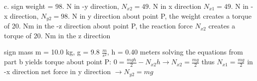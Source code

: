 c. sign weight = 98. N in -y direction, $N_{x2} = 49.$ N in x direction\newline
$N_{x1} = 49.$ N in -x direction, $N_{y2} = 98.$ N in y direction\newline
about point P, the weight creates a torque of 20. Nm in the -z direction\newline
about point P, the reaction force $N_{x2}$ creates a torque of 20. Nm in the z direction\newline

sign mass m = 10.0 kg, g = 9.8 $\frac{m}{s^{2}}$, h = 0.40 meters\newline
solving the equations from part b yields\newline
torque about point P: $0 = \frac{mgh}{2} - N_{x2}h \rightarrow N_{x2} = \frac{mg}{2}$\newline
thus $N_{x1} = \frac{mg}{2}$ in -x direction\newline
net force in y direction $\rightarrow N_{y2} = mg$

